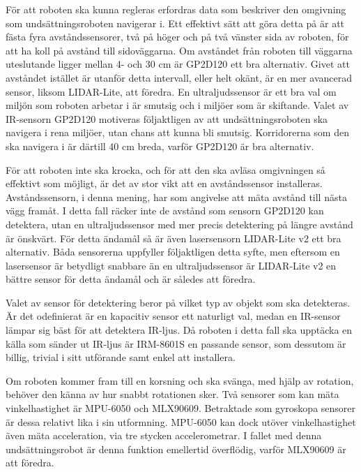 \documentclass[11pt]{article}
\begin{document}
\begin{flushleft}
För att roboten ska kunna regleras erfordras data som beskriver den omgivning som undsättningsroboten navigerar i. Ett effektivt sätt att göra detta på är att fästa fyra avståndssensorer, två på höger och på två vänster sida av roboten, för att ha koll på avstånd till sidoväggarna. Om avståndet från roboten till väggarna uteslutande ligger mellan 4- och 30 cm är GP2D120 ett bra alternativ. Givet att avståndet istället är utanför detta intervall, eller helt okänt, är en mer avancerad sensor, liksom LIDAR-Lite, att föredra. En ultraljudssensor är ett bra val om miljön som roboten arbetar i är smutsig och i miljöer som är skiftande. Valet av IR-sensorn GP2D120 motiveras följaktligen av att undsättningsroboten ska navigera i rena miljöer, utan chans att kunna bli smutsig. Korridorerna som den ska navigera i är därtill 40 cm breda, varför GP2D120 är bra alternativ. 

För att roboten inte ska krocka, och för att den ska avläsa omgivningen så effektivt som möjligt, är det av stor vikt att en avståndssensor installeras. Avståndssensorn, i denna mening, har som angivelse att mäta avstånd till nästa vägg framåt. I detta fall räcker inte de avstånd som sensorn GP2D120 kan detektera, utan en ultraljudssensor med mer precis detektering på längre avstånd är önskvärt. För detta ändamål så är även lasersensorn LIDAR-Lite v2 ett bra alternativ. Båda sensorerna uppfyller följaktligen detta syfte, men eftersom en lasersensor är betydligt snabbare än en ultraljudssensor är LIDAR-Lite v2 en bättre sensor för detta ändamål och är således att föredra. 

Valet av sensor för detektering beror på vilket typ av objekt som ska detekteras. Är det odefinierat är en kapacitiv sensor ett naturligt val, medan en IR-sensor lämpar sig bäst för att detektera IR-ljus. Då roboten i detta fall ska upptäcka en källa som sänder ut IR-ljus är IRM-8601S en passande sensor, som dessutom är billig, trivial i sitt utförande samt enkel att installera.

Om roboten kommer fram till en korsning och ska svänga, med hjälp av rotation, behöver den känna av hur snabbt rotationen sker. Två sensorer som kan mäta vinkelhastighet är MPU-6050 och MLX90609. Betraktade som gyroskopa sensorer är dessa relativt lika i sin utformning. MPU-6050 kan dock utöver vinkelhastighet även mäta acceleration, via tre stycken accelerometrar. I fallet med denna undsättningsrobot är denna funktion emellertid överflödig, varför MLX90609 är att föredra. 


\pagebreak





\pagebreak
\appendix

\end{flushleft}



\end{document}
